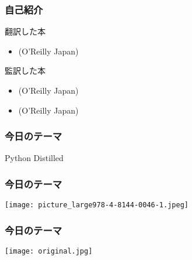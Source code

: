 \documentclass[aspectratio=169,dvipdfmx,12pt,notheorems]{beamer}
\theoremstyle{definition}
\begin{document}
\begin{frame}\frametitle{自己紹介}

\begin{block}{翻訳した本}
\begin{itemize}
\item {}(O'Reilly Japan)  
\end{itemize}
\end{block}

\begin{block}{監訳した本}
\begin{itemize}
\item {}(O'Reilly Japan) 
\item {}(O'Reilly Japan) 
\end{itemize}
\end{block}

\end{frame}

\begin{frame}\frametitle{今日のテーマ}

\begin{center}
\Huge{Python Distilled}
\end{center}

\end{frame}

\begin{frame}\frametitle{今日のテーマ}

\begin{center}
\texttt{[image: picture\_large978-4-8144-0046-1.jpeg]}
\end{center}

\end{frame}

\begin{frame}\frametitle{今日のテーマ}

\begin{center}
\texttt{[image: original.jpg]}
\end{center}

\end{frame}
\end{document}
